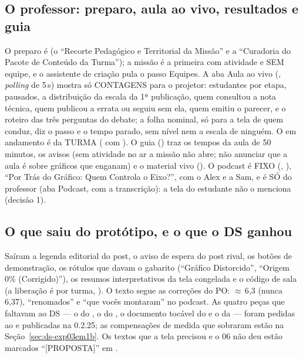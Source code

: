 \subsection{O professor: preparo, aula ao vivo, resultados e guia}

O preparo é  (o
\enquote{Recorte Pedagógico e Territorial da Missão} e a \enquote{Curadoria
do Pacote de Conteúdo da Turma}); a missão é a primeira com atividade e SEM
equipe, e o assistente de criação pula o passo Equipes. A aba Aula ao vivo
(, \emph{polling} de
5\,s) mostra só CONTAGENS para o projetor: estudantes por etapa, pausados, a
distribuição da escala da 1ª publicação, quem consultou a nota técnica, quem
publicou a errata ou seguiu sem ela, quem emitiu o parecer, e o roteiro das
três perguntas do debate; a folha nominal, só para a tela de quem conduz,
diz o passo e o tempo parado, sem nível nem a escala de ninguém. O em
andamento é da TURMA ( com ). O
guia () traz os tempos da aula
de 50 minutos, os avisos (sem atividade no ar a missão não abre; não anunciar
que a aula é sobre gráficos que enganam) e o material vivo
(). O podcast é FIXO
(, ), \enquote{Por Trás do Gráfico: Quem Controla
o Eixo?}, com o Alex e a Sam, e é SÓ do professor (aba Podcast, com a
transcrição): a tela do estudante não o menciona (decisão 1).

\subsection{O que saiu do protótipo, e o que o DS ganhou}

Saíram a legenda editorial do post, o aviso de espera do post rival, os
botões de demonstração, os rótulos que davam o gabarito (\enquote{Gráfico
Distorcido}, \enquote{Origem 0\% (Corrigido)}), os resumos interpretativos da
tela congelada e o código de sala (a liberação é por turma,
). O texto segue as correções do PO: $\approx$\,6,3 (nunca 6,37),
\enquote{renomados} e \enquote{que vocês montaram} no podcast. As quatro
peças que faltavam ao DS --- o  do , o 
do , o documento tocável do  e o
 da  --- foram pedidas ao  e
publicadas na 0.2.25; as compensações de medida que sobraram estão na
Seção~\ref{sec:ds-exp03em1b}. Os textos que a tela precisou e o 06 não deu
estão marcados \enquote{[PROPOSTA]} em .

